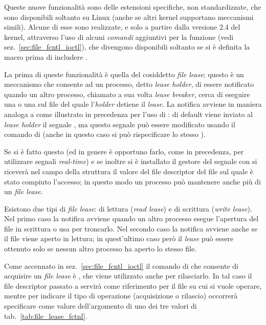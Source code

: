 Queste nuove funzionalità sono delle estensioni specifiche, non
standardizzate, che sono disponibili soltanto su Linux (anche se altri kernel
supportano meccanismi simili). Alcune di esse sono realizzate, e solo a
partire dalla versione 2.4 del kernel, attraverso l'uso di alcuni
\textsl{comandi} aggiuntivi per la funzione  (vedi
sez.~\ref{sec:file_fcntl_ioctl}), che divengono disponibili soltanto se si è
definita la macro  prima di includere .


La prima di queste funzionalità è quella del cosiddetto \textit{file lease};
questo è un meccanismo che consente ad un processo, detto \textit{lease
  holder}, di essere notificato quando un altro processo, chiamato a sua volta
\textit{lease breaker}, cerca di eseguire una  o una
 sul file del quale l'\textit{holder} detiene il
\textit{lease}.  La notifica avviene in maniera analoga a come illustrato in
precedenza per l'uso di : di default viene inviato al
\textit{lease holder} il segnale , ma questo segnale può essere
modificato usando il comando  di  (anche in
questo caso si può rispecificare lo stesso ).

Se si è fatto questo (ed in genere è opportuno farlo, come in precedenza, per
utilizzare segnali \textit{real-time}) e se inoltre si è installato il gestore
del segnale con  si riceverà nel campo  della
struttura  il valore del file descriptor del file sul quale
è stato compiuto l'accesso; in questo modo un processo può mantenere anche più
di un \textit{file lease}.

Esistono due tipi di \textit{file lease}: di lettura (\textit{read lease}) e
di scrittura (\textit{write lease}). Nel primo caso la notifica avviene quando
un altro processo esegue l'apertura del file in scrittura o usa
 per troncarlo. Nel secondo caso la notifica avviene anche se
il file viene aperto in lettura; in quest'ultimo caso però il \textit{lease}
può essere ottenuto solo se nessun altro processo ha aperto lo stesso file.

Come accennato in sez.~\ref{sec:file_fcntl_ioctl} il comando di 
che consente di acquisire un \textit{file lease} è , che
viene utilizzato anche per rilasciarlo. In tal caso il file
descriptor  passato a  servirà come riferimento per il
file su cui si vuole operare, mentre per indicare il tipo di operazione
(acquisizione o rilascio) occorrerà specificare come valore
dell'argomento  di  uno dei tre valori di
tab.~\ref{tab:file_lease_fctnl}.

